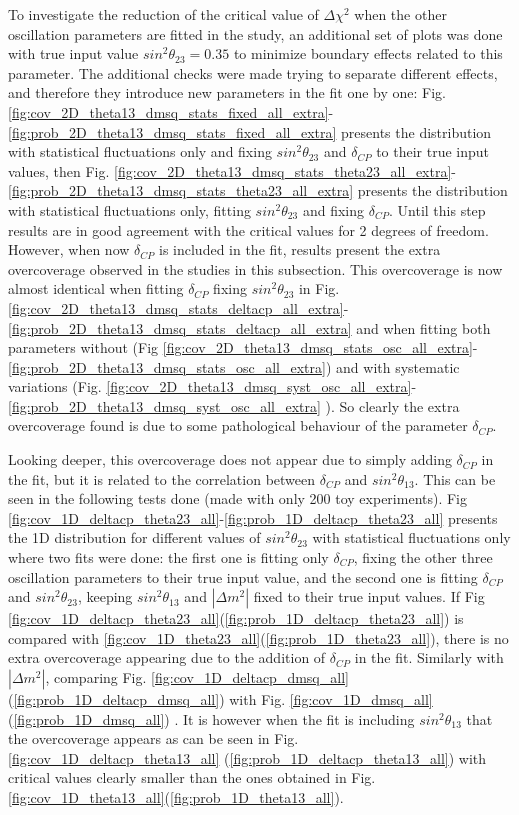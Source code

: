 To investigate the reduction of the critical value of $\Delta\chi^{2}$ when the other oscillation parameters are fitted in the study, an additional set of plots was done with true input value $sin^{2}\theta_{23} = 0.35$ to minimize boundary effects related to this parameter. The additional checks were made trying to separate different effects, and therefore they introduce new parameters in the fit one by one: Fig.\ref{fig:cov_2D_theta13_dmsq_stats_fixed_all_extra}-\ref{fig:prob_2D_theta13_dmsq_stats_fixed_all_extra} presents the distribution with statistical fluctuations only and fixing $sin^{2}\theta_{23}$ and $\delta_{CP}$ to their true input values, then Fig. \ref{fig:cov_2D_theta13_dmsq_stats_theta23_all_extra}-\ref{fig:prob_2D_theta13_dmsq_stats_theta23_all_extra} presents the distribution with statistical fluctuations only, fitting $sin^{2}\theta_{23}$ and fixing $\delta_{CP}$. Until this step results are in good agreement with the critical values for 2 degrees of freedom. However, when now $\delta_{CP}$ is included in the fit, results present the extra overcoverage observed in the studies in this subsection. This overcoverage is now almost identical when fitting $\delta_{CP}$ fixing $sin^{2}\theta_{23}$ in Fig. \ref{fig:cov_2D_theta13_dmsq_stats_deltacp_all_extra}-\ref{fig:prob_2D_theta13_dmsq_stats_deltacp_all_extra} and when fitting both parameters without (Fig \ref{fig:cov_2D_theta13_dmsq_stats_osc_all_extra}-\ref{fig:prob_2D_theta13_dmsq_stats_osc_all_extra}) and with systematic variations (Fig. \ref{fig:cov_2D_theta13_dmsq_syst_osc_all_extra}-\ref{fig:prob_2D_theta13_dmsq_syst_osc_all_extra} ). So clearly the extra overcoverage found is due to some pathological behaviour of the parameter $\delta_{CP}$.

Looking deeper, this overcoverage does not appear due to simply adding $\delta_{CP}$ in the fit, but it is related to the correlation between $\delta_{CP}$ and $sin^{2}\theta_{13}$. This can be seen in the following tests done (made with only 200 toy experiments). 
Fig \ref{fig:cov_1D_deltacp_theta23_all}-\ref{fig:prob_1D_deltacp_theta23_all} presents the 1D distribution for different values of $sin^{2}\theta_{23}$ with statistical fluctuations only where two fits were done: the first one is fitting only $\delta_{CP}$, fixing the other three oscillation parameters to their true input value, and the second one is fitting $\delta_{CP}$ and $sin^{2}\theta_{23}$, keeping $sin^{2}\theta_{13}$ and $|\Delta m^{2}|$ fixed to their true input values. If Fig \ref{fig:cov_1D_deltacp_theta23_all}(\ref{fig:prob_1D_deltacp_theta23_all}) is compared with \ref{fig:cov_1D_theta23_all}(\ref{fig:prob_1D_theta23_all}), there is no extra overcoverage appearing due to the addition of $\delta_{CP}$ in the fit. Similarly with $|\Delta m^{2}|$, comparing Fig. \ref{fig:cov_1D_deltacp_dmsq_all}(\ref{fig:prob_1D_deltacp_dmsq_all}) with Fig. \ref{fig:cov_1D_dmsq_all}(\ref{fig:prob_1D_dmsq_all}) . It is however when the fit is including $sin^{2}\theta_{13}$ that the overcoverage appears as can be seen in Fig. \ref{fig:cov_1D_deltacp_theta13_all} (\ref{fig:prob_1D_deltacp_theta13_all}) with critical values clearly smaller than the ones obtained in Fig. \ref{fig:cov_1D_theta13_all}(\ref{fig:prob_1D_theta13_all}).

